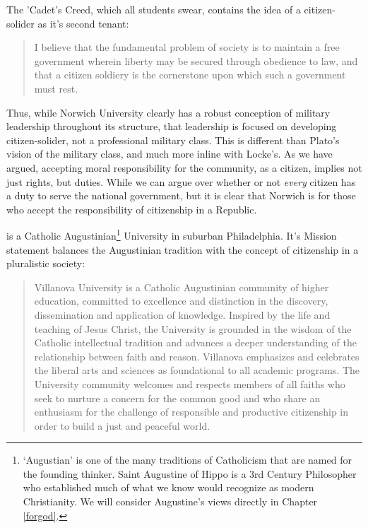 The 'Cadet's Creed, which all students swear, contains the idea of a citizen-solider as it's second tenant:

\begin{quote}

I believe that the fundamental problem of society is to maintain a free government wherein liberty may be secured through obedience to law, and that a citizen soldiery is the cornerstone upon which such a government must rest.
\end{quote}

Thus, while Norwich University clearly has a robust conception of military leadership throughout its structure, that leadership is focused on developing citizen-solider, not a professional military class. This is different than Plato's vision of the military class, and much more inline with Locke's. As we have argued, accepting moral responsibility for the community, as a citizen, implies not just rights, but duties. While we can argue over whether or not \emph{every} citizen has a duty to serve the national government, but it is clear that Norwich is for those who accept the responsibility of citizenship in a Republic.

 is a Catholic Augustinian\footnote{`Augustian' is one of the many traditions of Catholicism that are named for the founding thinker. Saint Augustine of Hippo is a 3rd Century Philosopher who established much of what we know would recognize as modern Christianity. We will consider Augustine's views directly in Chapter \ref{forgod}.} University in suburban Philadelphia. It's Mission statement balances the Augustinian tradition with the concept of citizenship in a pluralistic society:

\begin{quote}

Villanova University is a Catholic Augustinian community of higher education, committed to excellence and distinction in the discovery, dissemination and application of knowledge. Inspired by the life and teaching of Jesus Christ, the University is grounded in the wisdom of the Catholic intellectual tradition and advances a deeper understanding of the relationship between faith and reason. Villanova emphasizes and celebrates the liberal arts and sciences as foundational to all academic programs. The University community welcomes and respects members of all faiths who seek to nurture a concern for the common good and who share an enthusiasm for the challenge of responsible and productive citizenship in order to build a just and peaceful world.
\end{quote}

